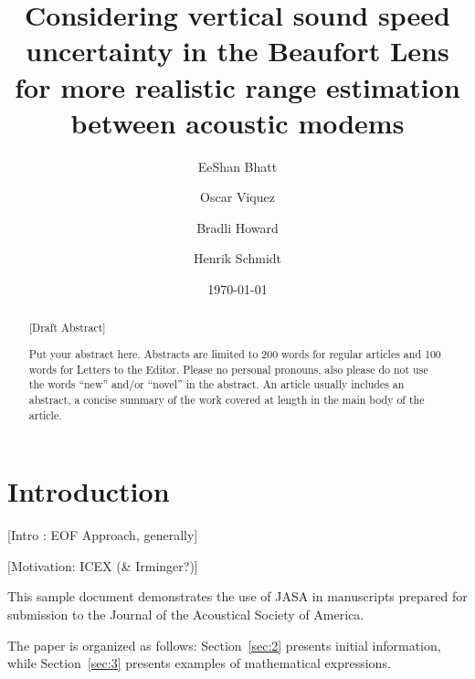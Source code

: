\title[JASA/Sample JASA Article]{Considering vertical sound speed uncertainty in the Beaufort Lens for more realistic range estimation between acoustic modems}
\author{EeShan Bhatt}
\author{Oscar Viquez}
\author{Bradli Howard}
\author{Henrik Schmidt}




\date{\today}

\begin{abstract}

{\color{red}[Draft Abstract]}

Put your abstract here. Abstracts are limited to 200 words for
regular articles and 100 words for Letters to the Editor. Please no
personal pronouns, also please do not use the words ``new'' and/or
``novel'' in the abstract. An article usually includes an abstract, a
concise summary of the work covered at length in the main body of the
article.
\end{abstract}


\maketitle



\section{\label{sec:1} Introduction}

{\color{red}
[Intro : EOF Approach, generally]

[Motivation: ICEX (\& Irminger?)]
}

This sample document demonstrates the use of JASA in manuscripts
prepared for submission to the Journal of the Acoustical Society of America.

The paper is organized as follows: Section~\ref{sec:2} presents
initial information, while
Section~\ref{sec:3} presents examples of mathematical expressions.



